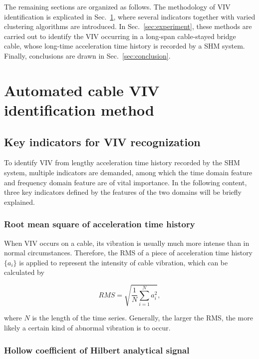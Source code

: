 \documentclass[preprint, 3p, times, compress, 11pt]{elsarticle}
\begin{document}
The remaining sections are organized as follows. The methodology of VIV 
identification is explicated in Sec.~\ref{sec:method}, where several 
indicators together with varied clustering algorithms are introduced. 
In Sec.~\ref{sec:experiment}, these methods are carried out to identify 
the VIV occurring in a long-span cable-stayed bridge cable, whose 
long-time acceleration time history is recorded by a SHM system. Finally, 
conclusions are drawn in Sec.~\ref{sec:conclusion}.

\section{Automated cable VIV identification method}
\label{sec:method}

\subsection{Key indicators for VIV recognization} 

To identify VIV from lengthy acceleration time history recorded by the SHM 
system, multiple indicators are demanded, among which the time domain 
feature and frequency domain feature are of vital importance. In the 
following content, three key indicators defined by the features of the 
two domains will be briefly explained. 

\subsubsection{Root mean square of acceleration time history}

When VIV occurs on a cable, its vibration is usually much more intense 
than in normal circumstances. Therefore, the RMS of a piece of 
acceleration time history $\{a_i\}$ is applied to represent the intensity 
of cable vibration, which can be calculated by 

\begin{equation}
    RMS = \sqrt{\frac{1}{N} \sum_{i=1}^{N} a_{i}^{2}},
    \label{eq:RMS}
\end{equation}

where $N$ is the length of the time series. Generally, the larger the RMS, 
the more likely a certain kind of abnormal vibration is to occur.

\subsubsection{Hollow coefficient of Hilbert analytical signal}
\end{document}
